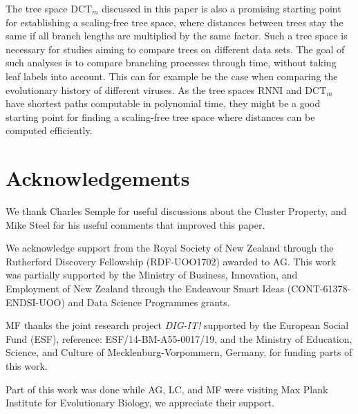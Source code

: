 \documentclass[11pt]{amsart}
\newcommand{\rnni}{\mathrm{RNNI}}
\newcommand{\dtt}{\mathrm{DCT}}
\newcommand{\summary}[1]{} %
\begin{document}
\summary{scaling-free tree space}
The tree space $\dtt_m$ discussed in this paper is also a promising starting point for establishing a scaling-free tree space, where distances between trees stay the same if all branch lengths are multiplied by the same factor.
Such a tree space is necessary for studies aiming to compare trees on different data sets.
The goal of such analyses is to compare branching processes through time, without taking leaf labels into account.
This can for example be the case when comparing the evolutionary history of different viruses.
As the tree spaces $\rnni$ and $\dtt_m$ have shortest paths computable in polynomial time, they might be a good starting point for finding a scaling-free tree space where distances can be computed efficiently.

\section*{Acknowledgements}
We thank Charles Semple for useful discussions about the Cluster Property, and Mike Steel for his useful comments that improved this paper.

We acknowledge support from the Royal Society of New Zealand through the Rutherford Discovery Fellowship (RDF-UOO1702) awarded to AG.
This work was partially supported by the Ministry of Business, Innovation, and Employment of New Zealand through the Endeavour Smart Ideas (CONT-61378-ENDSI-UOO) and Data Science Programmes grants.

MF thanks the joint research project \textit{DIG-IT!} supported by the European Social Fund (ESF), reference: ESF/14-BM-A55-0017/19, and the Ministry of Education, Science, and Culture of Mecklenburg-Vorpommern, Germany, for funding parts of this work.

Part of this work was done while AG, LC, and MF were visiting Max Plank Institute for Evolutionary Biology, we appreciate their support.

\printbibliography
\end{document}
